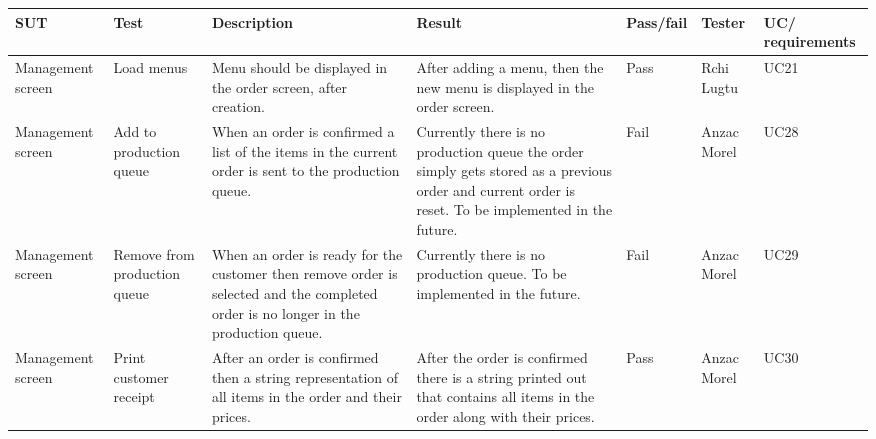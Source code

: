 \begin{tabularx}{\linewidth}{|X|X|X|X|X|X|X|}
\hline
SUT & Test & Description & Result & Pass/fail & Tester & UC/ requirements \\
\hline
Management screen & Load menus & Menu should be displayed in the order screen, after creation. & After adding a menu, then the new menu is displayed in the order screen. & Pass & Rchi Lugtu & UC21 \\
\hline
Management screen & Add to production queue & When an order is confirmed a list of the items in the current order is sent to the production queue. & Currently there is no production queue the order simply gets stored as a previous order and current order is reset. To be implemented in the future. & Fail & Anzac Morel & UC28 \\
\hline
Management screen & Remove from production queue & When an order is ready for the customer then remove order is selected and the completed order is no longer in the production queue. & Currently there is no production queue. To be implemented in the future. & Fail & Anzac Morel & UC29 \\
\hline
Management screen & Print customer receipt & After an order is confirmed then a string representation of all items in the order and their prices. & After the order is confirmed there is a string printed out that contains all items in the order along with their prices. & Pass & Anzac Morel & UC30 \\
\hline
\end{tabularx}